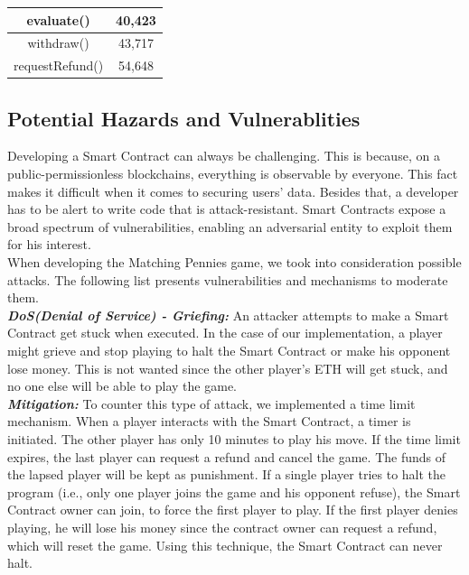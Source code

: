 \documentclass[12pt,a4paper]{article}
\begin{document}
\begin{table}[htpb]
\begin{center}
\begin{tabular}{ccc}
        \multicolumn{1}{|c|}{evaluate()}                     & \multicolumn{2}{c|}{40,423}                                                                       \\ \hline
        \multicolumn{1}{|c|}{withdraw()}                     & \multicolumn{2}{c|}{43,717}                                                                       \\ \hline
        \multicolumn{1}{|c|}{requestRefund()}                & \multicolumn{2}{c|}{54,648}                                                                       \\ \hline
        \end{tabular}
    \end{center}
\end{table}

\subsection*{Potential Hazards and Vulnerablities}

Developing a Smart Contract can always be challenging. This is because, on a public-permissionless blockchains, everything is observable by everyone. This fact makes it difficult when it comes to securing users’ data. Besides that, a developer has to be alert to write code that is attack-resistant. Smart Contracts expose a broad spectrum of vulnerabilities, enabling an adversarial entity to exploit them for his interest.\\

When developing the Matching Pennies game, we took into consideration possible attacks.
The following list presents vulnerabilities and mechanisms to moderate them. \\

\textbf{\emph{DoS(Denial of Service) - Griefing: }}An attacker attempts to make a Smart Contract get stuck when executed. In the case of our implementation, a player might grieve and stop playing to halt the Smart Contract or make his opponent lose money. This is not wanted since the other player’s ETH will get stuck, and no one else will be able to play the game. \\

\textbf{\emph{Mitigation: }}To counter this type of attack, we implemented a time limit mechanism. When a player interacts with the Smart Contract, a timer is initiated. The other player has only 10 minutes to play his move. If the time limit expires, the last player can request a refund and cancel the game. The funds of the lapsed player will be kept as punishment. If a single player tries to halt the program (i.e., only one player joins the game and his opponent refuse), the Smart Contract owner can join, to force the first player to play. If the first player denies playing, he will lose his money since the contract owner can request a refund, which will reset the game. Using this technique, the Smart Contract can never halt.\\
\end{document}
